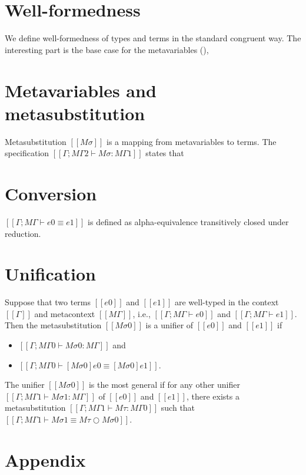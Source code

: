 \documentclass[acmsmall,natbib=false,review,anonymous]{acmart}
\begin{document}
\ottdefnRedNeutLabeled{}

\section{Well-formedness}

We define well-formedness of types and terms
in the standard congruent way.
The interesting part is the base case for the metavariables
(),

  \begin{ottdefnblock}[]{\ottdefnHeaderWfWF}{}
    \ottusedrule{\ottdruleWfWFVarLabeled[]{}}
    \ottusedrule{\ottdruleWfWFPLamLabeled[]{}}
    \ottusedrule{\ottdruleWfWFAVarLabeled[]{}}
  \end{ottdefnblock}


\section{Metavariables and metasubstitution}

\begin{definition}
  Metasubstitution $[[Mσ]]$
  is a mapping from metavariables to terms.
  The  specification 
  $[[Γ; MΓ2 ⊢ Mσ : MΓ1]]$ states that
\end{definition}


\section{Conversion}

\begin{definition}
 $[[Γ; MΓ ⊢ e0 ≡ e1]]$
 is defined as alpha-equivalence 
 transitively closed under reduction. 
\end{definition}



\section{Unification}


\begin{definition}
  Suppose that two terms $[[e0]]$ and 
  $[[e1]]$ are well-typed in the context $[[Γ]]$
  and metacontext $[[MΓ]]$, i.e., $[[Γ; MΓ ⊢ e0]]$
  and $[[Γ; MΓ ⊢ e1]]$.
  Then the metasubstitution $[[Mσ0]]$ is a unifier
  of $[[e0]]$ and $[[e1]]$ if
  \begin{itemize}
    \item $[[Γ; MΓ0 ⊢ Mσ0 : MΓ]]$ and
    \item $[[Γ; MΓ0 ⊢ [Mσ0]e0 ≡ [Mσ0]e1]]$.
  \end{itemize}

  The unifier $[[Mσ0]]$ is the most general if 
  for any other unifier $[[Γ; MΓ1 ⊢ Mσ1 : MΓ]]$ 
  of $[[e0]]$ and $[[e1]]$,
  there exists a metasubstitution $[[Γ; MΓ1 ⊢ Mτ : MΓ0]]$
  such that $[[Γ; MΓ1 ⊢ Mσ1 ≡ Mτ ○ Mσ0]]$.
\end{definition}


\newpage

\appendix

\section{Appendix}

\ottdefnRedRedLabeled{}

\ottdefnWfWFLabeled{}
\end{document}
